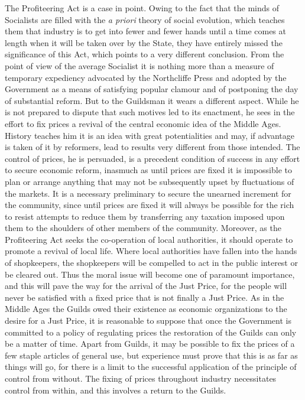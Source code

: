\documentclass{book}
\begin{document}
The Profiteering Act is a case in point. Owing to the fact that the minds of Socialists are filled with the \emph{a priori} theory of social evolution, which teaches them that industry is to get into fewer and fewer hands until a time comes at length when it will be taken over by the State, they have entirely missed the significance of this Act, which points to a very different conclusion. From the point of view of the average Socialist it is nothing more than a measure of temporary expediency advocated by the Northcliffe Press and adopted by the Government as a means of satisfying popular clamour and of postponing the day of substantial reform. But to the Guildsman it wears a different aspect. While he is not prepared to dispute that such motives led to its enactment, he sees in the effort to fix prices a revival of the central economic idea of the Middle Ages. History teaches him it is an idea with great potentialities and may, if advantage is taken of it by reformers, lead to results very different from those intended. The control of prices, he is persuaded, is a precedent condition of success in any effort to secure economic reform, inasmuch as until prices are fixed it is impossible to plan or arrange anything that may not be subsequently upset by fluctuations of the markets. It is a necessary preliminary to secure the unearned increment for the community, since until prices are fixed it will always be possible for the rich to resist attempts to reduce them by transferring any taxation imposed upon them to the shoulders of other members of the community. Moreover, as the Profiteering Act seeks the co-operation of local authorities, it should operate to promote a revival of local life. Where local authorities have fallen into the hands of shopkeepers, the shopkeepers will be compelled to act in the public interest or be cleared out. Thus the moral issue will become one of paramount importance, and this will pave the way for the arrival of the Just Price, for the people will never be satisfied with a fixed price that is not finally a Just Price. As in the Middle Ages the Guilds owed their existence as economic organizations to the desire for a Just Price, it is reasonable to suppose that once the Government is committed to a policy of regulating prices the restoration of the Guilds can only be a matter of time. Apart from Guilds, it may be possible to fix the prices of a few staple articles of general use, but experience must prove that this is as far as things will go, for there is a limit to the successful application of the principle of control from without. The fixing of prices throughout industry necessitates control from within, and this involves a return to the Guilds.
\end{document}
